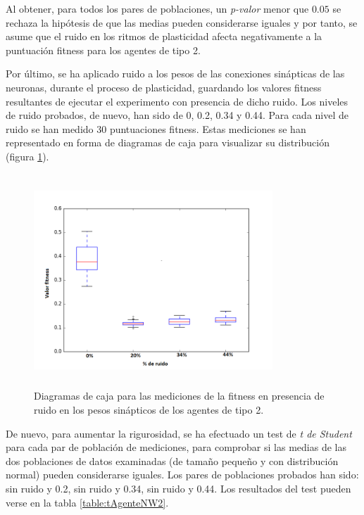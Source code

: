 Al obtener, para todos los pares de poblaciones, un \textit{p-valor} menor que $0.05$ se rechaza la hipótesis de que las medias pueden considerarse iguales y por tanto, se asume que el ruido en los ritmos de plasticidad afecta negativamente a la puntuación fitness para los agentes de tipo 2.

Por último, se ha aplicado ruido a los pesos de las conexiones sinápticas de las neuronas, durante el proceso de plasticidad, guardando los valores fitness resultantes de ejecutar el experimento con presencia de dicho ruido. Los niveles de ruido probados,
de nuevo, han sido de 0, 0.2, 0.34 y 0.44. Para cada nivel de ruido se han medido 30 puntuaciones fitness. Estas mediciones se han representado en forma de diagramas de caja para visualizar su distribución (figura \ref{fig:boxPlotNW2}).

\begin{figure}[H]
    \centering
    \includegraphics[width=0.8\textwidth,height=8cm]{Imagenes/BoxPlotNW2}
    \caption{Diagramas de caja para las mediciones de la fitness en presencia de ruido en los pesos sinápticos de los agentes de tipo 2.}
    \label{fig:boxPlotNW2}
\end{figure}

De nuevo, para aumentar la rigurosidad, se ha efectuado un test de \textit{t de Student} para cada par de población de mediciones, para comprobar si las medias de las dos poblaciones de datos examinadas (de tamaño pequeño y con distribución normal) pueden considerarse iguales.
Los pares de poblaciones probados han sido: sin ruido y 0.2, sin ruido y 0.34, sin ruido y 0.44. Los resultados del test pueden verse en la tabla \ref{table:tAgenteNW2}.

